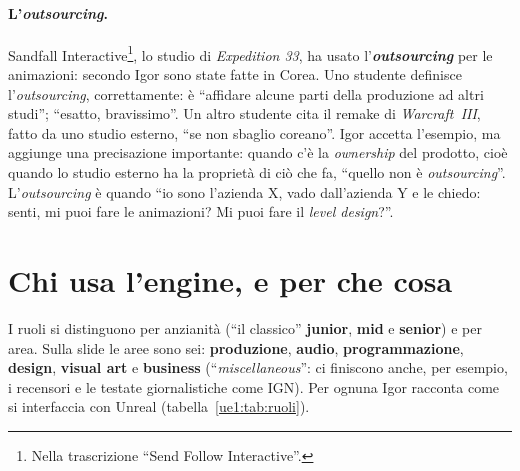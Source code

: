 \paragraph{L'\emph{outsourcing}.} Sandfall Interactive\footnote{Nella trascrizione
``Send Follow Interactive''.}, lo studio di \emph{Expedition 33}, ha usato
l'\textbf{\emph{outsourcing}} per le animazioni: secondo Igor sono state fatte in
Corea. Uno studente definisce l'\emph{outsourcing}, correttamente: è ``affidare alcune
parti della produzione ad altri studi''; ``esatto, bravissimo''. Un altro studente cita
il remake di \emph{Warcraft~III}, fatto da uno studio esterno, ``se non sbaglio
coreano''. Igor accetta l'esempio, ma aggiunge una precisazione importante: quando c'è
la \emph{ownership} del prodotto, cioè quando lo studio esterno ha la proprietà di ciò
che fa, ``quello non è \emph{outsourcing}''. L'\emph{outsourcing} è quando ``io sono
l'azienda X, vado dall'azienda Y e le chiedo: senti, mi puoi fare le animazioni? Mi
puoi fare il \emph{level design}?''.

\section{Chi usa l'engine, e per che cosa}
\label{ue1:sec:ruoli}

I ruoli si distinguono per anzianità (``il classico'' \textbf{junior}, \textbf{mid} e
\textbf{senior}) e per area. Sulla slide le aree sono sei: \textbf{produzione},
\textbf{audio}, \textbf{programmazione}, \textbf{design}, \textbf{visual art} e
\textbf{business} (``\emph{miscellaneous}'': ci finiscono anche, per esempio, i
recensori e le testate giornalistiche come IGN). Per ognuna Igor racconta come si
interfaccia con Unreal (tabella~\ref{ue1:tab:ruoli}).

